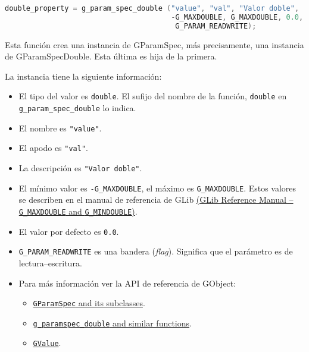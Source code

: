 \begin{lstlisting}[language=C]
double_property = g_param_spec_double ("value", "val", "Valor doble",
                                       -G_MAXDOUBLE, G_MAXDOUBLE, 0.0,
                                        G_PARAM_READWRITE);
\end{lstlisting}

Esta función crea una instancia de \textsf{GParamSpec}, más precisamente, una instancia
de \textsf{GParamSpecDouble}. Esta última es hija de la primera.

La instancia tiene la siguiente información:
\vspace{-\topsep}
\begin{itemize}
  \tightlist
\item El tipo del valor es \texttt{double}. El sufijo del nombre de la función,
  \texttt{double} en \texttt{g\_param\_spec\_double} lo indica.
\item El nombre es \texttt{"value"}.
\item El apodo es \texttt{"val"}.
\item La descripción es \texttt{"Valor doble"}.
\item El mínimo valor es \texttt{-G\_MAXDOUBLE}, el máximo es \texttt{G\_MAXDOUBLE}.
  Estos valores se describen en el manual de referencia de GLib
  \href{https://docs.gtk.org/glib/types.html#gdouble}{(GLib Reference Manual -- \texttt{G\_MAXDOUBLE} and \texttt{G\_MINDOUBLE})}.
\item El valor por defecto es \texttt{0.0}.
\item \texttt{G\_PARAM\_READWRITE} es una bandera (\emph{flag}). Significa que el
  parámetro es de lectura--escritura.
\item Para más información ver la API de referencia de \textsf{GObject}:
  \vspace{-\topsep}
  \vspace{0.8ex}
  \begin{itemize}
    \tightlist
  \item \href{https://docs.gtk.org/gobject/index.html#classes}
    {\texttt{GParamSpec} and its subclasses}.
  \item \href{https://docs.gtk.org/gobject/index.html#functions}
    {\texttt{g\_paramspec\_double} and similar functions}.
  \item \href{https://docs.gtk.org/gobject/struct.Value.html}
    {\texttt{GValue}}.
  \end{itemize}
\end{itemize}





  

